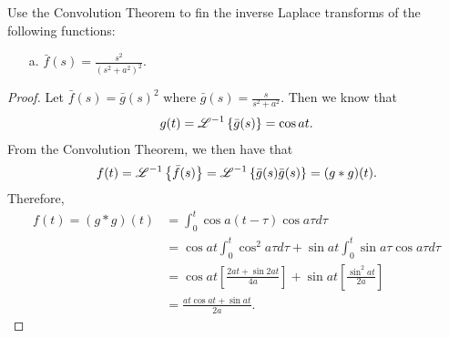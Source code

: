 \begin{problem}{3.8}
  Use the Convolution Theorem to fin the inverse Laplace transforms of the following functions:
  \begin{enumerate}
    \item[a.] $\displaystyle \bar{f}(s) = \frac{s^2}{(s^2+a^2)^2}$.
  \end{enumerate}
\end{problem}

\begin{proof}
  Let $\bar{f}(s) = \bar{g}(s)^2$ where $\displaystyle \bar{g}(s) = \frac{s}{s^2 + a^2}$.
  Then we know that
  \begin{align*}
    g(t) = \mathscr{L}^{-1}\left\{ {\bar{g}(s)} \right\} = \cos at.
  \end{align*}
  From the Convolution Theorem, we then have that
  \begin{align*}
    f(t) = \mathscr{L}^{-1}\left\{ {\bar{f}(s)} \right\} = \mathscr{L}^{-1}\left\{ {\bar{g}(s)\bar{g}(s)} \right\} = (g\ast g)(t).
  \end{align*}
  Therefore,
  \begin{align*}
    f(t) = (g \ast g )(t) &= \int_0^t \cos a (t-\tau) \cos a \tau d\tau \\
    &= \cos a t \int_0^t \cos^2 a\tau d\tau + \sin a t \int_0^t \sin a\tau \cos a \tau d\tau \\
    &= \cos a t\left[\frac{2 a t + \sin 2at}{4a}\right] + \sin at \left[\frac{\sin^2 at}{2a}\right] \\
    &= \frac{at \cos at + \sin a t}{2a}.
  \end{align*}
\end{proof}
\newpage
